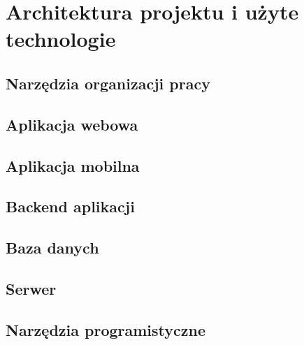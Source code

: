 \chapter{Architektura projektu i użyte technologie}

\section{Narzędzia organizacji pracy}
\section{Aplikacja webowa}
\section{Aplikacja mobilna}
\section{Backend aplikacji}
\section{Baza danych}
\section{Serwer}
\section{Narzędzia programistyczne}